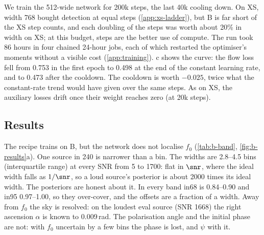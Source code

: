 We train the 512-wide network for 200k steps, the last 40k cooling down. On XS, width 768
bought detection at equal steps (\cref{app:xs-ladder}), but B is far short of the XS step
counts, and each doubling of the steps was worth about 20\% in width on XS; at this budget,
steps are the better use of compute. The run took 86 hours in four chained 24-hour jobs, each
of which restarted the optimiser's moments without a visible cost (\cref{app:training}).
c shows the curve: the flow loss fell from 0.753 in the first epoch to
0.498 at the end of the constant learning rate, and to 0.473 after the cooldown. The cooldown
is worth $-0.025$, twice what the constant-rate trend would have given over the same steps.
As on XS, the auxiliary losses drift once their weight reaches zero (at 20k steps).

\subsection{Results}

\begin{table}[h]
\caption{B by SNR band, on 240 sources in 60 windows (\cref{app:evaluation}). Almost no source
is found, so the widths and offsets are medians over every source narrower than 50 bins, not
over found sources as in \cref{tab:xs-final}; the 11 wider ones all have SNR below 10.}
\label{tab:b-band}
\centering
\small

\end{table}

The recipe trains on B, but the network does not localise $f_0$ (\cref{tab:b-band},
\cref{fig:b-results}a). One source in 240 is narrower than a bin. The widths are 2.8--4.5 bins
(interquartile range) at every SNR from 5 to 1700: flat in $\snr$, where the ideal width falls
as $1/\snr$, so a loud source's posterior is about 2000 times its ideal width. The posteriors
are honest about it. In every band in68 is 0.84--0.90 and in95 0.97--1.00, so they
over-cover, and the offsets are a fraction of a width. Away from $f_0$ the sky is resolved: on
the loudest eval source (SNR 1668) the right ascension $\alpha$ is known to 0.009\,rad. The
polarisation angle and the initial phase are not: with $f_0$ uncertain by a few bins the phase
is lost, and $\psi$ with it.

